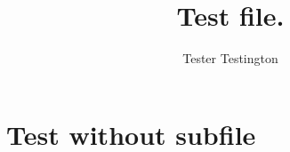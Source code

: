 \documentclass{article}
\title{Test file.}
\author{Tester Testington}
\begin{document}
\maketitle
\section{Test without subfile}

\end{document}
